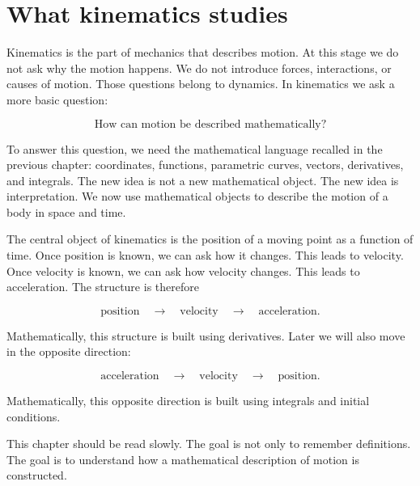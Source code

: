 \section{What kinematics studies}

Kinematics is the part of mechanics that describes motion. At this stage we do not ask why the motion happens. We do not introduce forces, interactions, or causes of motion. Those questions belong to dynamics. In kinematics we ask a more basic question:

\[
\text{How can motion be described mathematically?}
\]

To answer this question, we need the mathematical language recalled in the previous chapter: coordinates, functions, parametric curves, vectors, derivatives, and integrals. The new idea is not a new mathematical object. The new idea is interpretation. We now use mathematical objects to describe the motion of a body in space and time.

The central object of kinematics is the position of a moving point as a function of time. Once position is known, we can ask how it changes. This leads to velocity. Once velocity is known, we can ask how velocity changes. This leads to acceleration. The structure is therefore

\[
\text{position} \quad \longrightarrow \quad \text{velocity} \quad \longrightarrow \quad \text{acceleration}.
\]

Mathematically, this structure is built using derivatives. Later we will also move in the opposite direction:

\[
\text{acceleration} \quad \longrightarrow \quad \text{velocity} \quad \longrightarrow \quad \text{position}.
\]

Mathematically, this opposite direction is built using integrals and initial conditions.

This chapter should be read slowly. The goal is not only to remember definitions. The goal is to understand how a mathematical description of motion is constructed.
